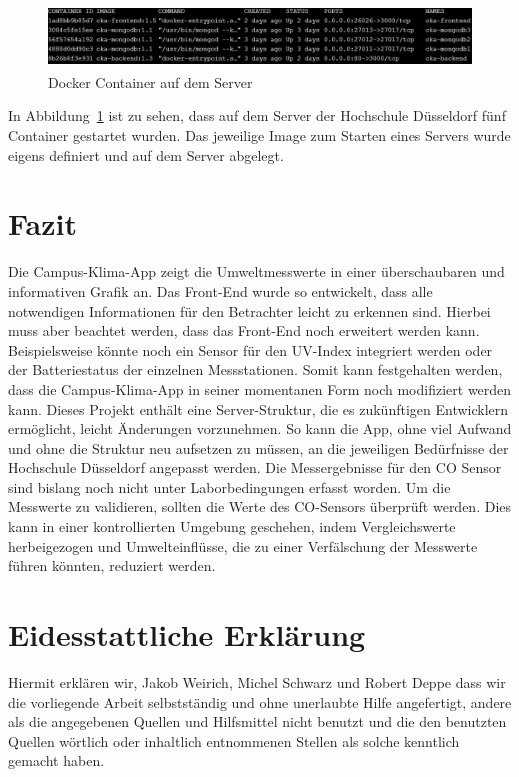 \documentclass{article}
\begin{document}
\begin{figure}[h]
 \centering
 \includegraphics[height=1.7cm]{images/cka-container-docker-ps}
 \caption{Docker Container auf dem Server}
 \label{fig:Docker Container auf dem Server}
\end{figure}

In Abbildung~\ref{fig:Docker Container auf dem Server} ist zu sehen, dass auf dem Server der Hochschule Düsseldorf fünf Container gestartet wurden. Das jeweilige Image zum Starten eines Servers wurde eigens definiert und auf dem Server abgelegt.
\newpage
\section{Fazit}
Die Campus-Klima-App zeigt die Umweltmesswerte in einer überschaubaren und informativen Grafik an. Das Front-End wurde so entwickelt, dass alle notwendigen Informationen für den Betrachter leicht zu erkennen sind.
Hierbei muss aber beachtet werden, dass das Front-End noch erweitert werden kann.
Beispielsweise könnte noch ein Sensor für den UV-Index integriert werden oder der Batteriestatus der einzelnen Messstationen.
Somit kann festgehalten werden, dass die Campus-Klima-App in seiner momentanen Form noch modifiziert werden kann. 
Dieses Projekt enthält eine Server-Struktur, die es zukünftigen Entwicklern ermöglicht, leicht Änderungen vorzunehmen.
So kann die App, ohne viel Aufwand und ohne die Struktur neu aufsetzen zu müssen, an die jeweiligen Bedürfnisse der Hochschule Düsseldorf angepasst werden.
Die Messergebnisse für den CO Sensor sind bislang noch nicht unter Laborbedingungen erfasst worden.
Um die Messwerte zu validieren, sollten die Werte des CO-Sensors überprüft werden.
Dies kann in einer kontrollierten Umgebung geschehen, indem Vergleichswerte herbeigezogen und Umwelteinflüsse, die zu einer Verfälschung der Messwerte führen könnten, reduziert werden.

\newpage

\listoffigures
\newpage

\newpage

\section*{Eidesstattliche Erklärung}
Hiermit erklären wir, Jakob Weirich, Michel Schwarz und Robert Deppe dass wir die vorliegende Arbeit selbstständig und ohne unerlaubte Hilfe angefertigt, andere als die angegebenen Quellen und Hilfsmittel nicht benutzt und die den benutzten Quellen wörtlich oder inhaltlich entnommenen Stellen als solche kenntlich gemacht haben.


\newpage

{}
\end{document}

